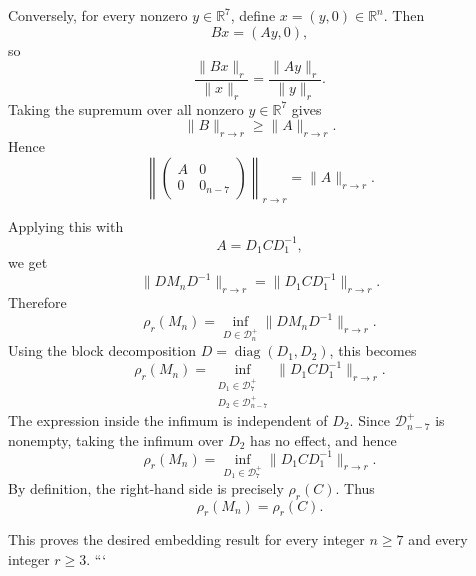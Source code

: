 Conversely, for every nonzero $y \in \mathbb{R}^7$, define $x=(y,0) \in \mathbb{R}^n$. Then
\[
Bx=(Ay,0),
\]
so
\[
\frac{\|Bx\|_r}{\|x\|_r}
=
\frac{\|Ay\|_r}{\|y\|_r}.
\]
Taking the supremum over all nonzero $y \in \mathbb{R}^7$ gives
\[
\|B\|_{r \to r} \geq \|A\|_{r \to r}.
\]
Hence
\[
\left\|
\begin{pmatrix}
A & 0\\
0 & 0_{n-7}
\end{pmatrix}
\right\|_{r \to r}
=
\|A\|_{r \to r}.
\]

Applying this with
\[
A=D_1 C D_1^{-1},
\]
we get
\[
\|DM_nD^{-1}\|_{r \to r}
=
\|D_1 C D_1^{-1}\|_{r \to r}.
\]
Therefore
\[
\rho_r(M_n)
=
\inf_{D \in \mathcal{D}_n^+}
\|DM_nD^{-1}\|_{r \to r}.
\]
Using the block decomposition $D=\operatorname{diag}(D_1,D_2)$, this becomes
\[
\rho_r(M_n)
=
\inf_{\substack{D_1 \in \mathcal{D}_7^+\\ D_2 \in \mathcal{D}_{n-7}^+}}
\|D_1 C D_1^{-1}\|_{r \to r}.
\]
The expression inside the infimum is independent of $D_2$. Since $\mathcal{D}_{n-7}^+$ is nonempty, taking the infimum over $D_2$ has no effect, and hence
\[
\rho_r(M_n)
=
\inf_{D_1 \in \mathcal{D}_7^+}
\|D_1 C D_1^{-1}\|_{r \to r}.
\]
By definition, the right-hand side is precisely $\rho_r(C)$. Thus
\[
\boxed{\rho_r(M_n)=\rho_r(C)}.
\]

This proves the desired embedding result for every integer $n \geq 7$ and every integer $r \geq 3$.
```